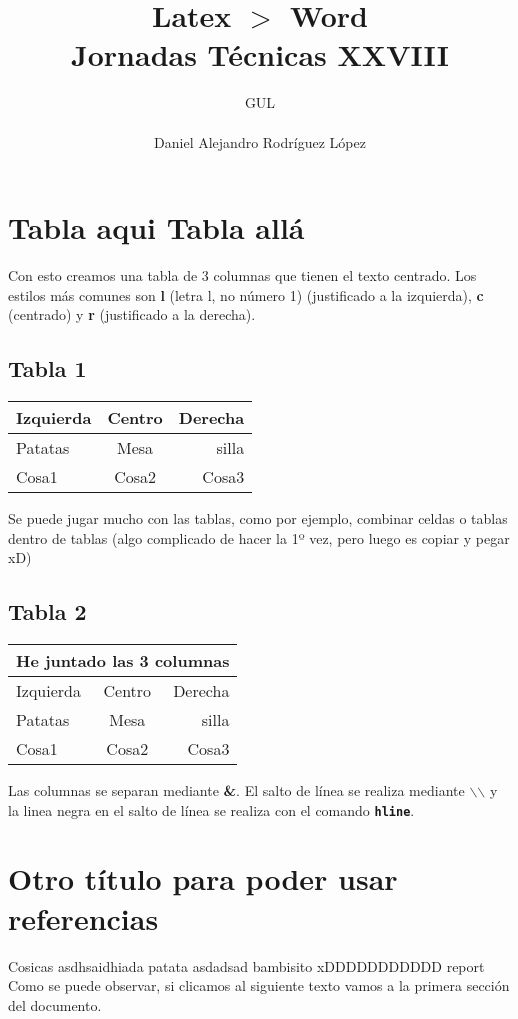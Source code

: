\documentclass[10pt,a4paper,titlepage]{article} %
\title{ \textbf{ \Huge{Latex $>$ Word}} \\ Jornadas Técnicas XXVIII}
\author{
		\begin{tabular}{l}
			\multicolumn{1}{l}{GUL} \\ \hline \\
			Daniel Alejandro Rodríguez López \\
		\end{tabular}
}
\begin{document}
\maketitle
\newpage

\tableofcontents
\newpage

	\section{Tabla aqui Tabla allá}
	\label{intro}
	Con esto creamos una tabla de 3 columnas que tienen el texto centrado. Los estilos más comunes son \textbf{l} (letra l, no número 1) (justificado a la izquierda), \textbf{c} (centrado) y \textbf{r} (justificado a la derecha). 

		\subsection{Tabla 1}
		\begin{center}
		\begin{tabular}{l c r}
		Izquierda & Centro & Derecha \\ \hline
		Patatas & Mesa & silla \\
		Cosa1 & Cosa2 & Cosa3 \\ \hline
		\end{tabular}
		\end{center}


		Se puede jugar mucho con las tablas, como por ejemplo, combinar celdas o tablas dentro de tablas (algo complicado de hacer la 1º vez, pero luego es copiar y pegar xD)

		\newpage
		\subsection{Tabla 2}
		\begin{center}
		\begin{tabular}{l c r}
		\multicolumn{3}{c}{He juntado las 3 columnas} \\ \hline
		Izquierda & Centro & Derecha \\ \hline
		Patatas & Mesa & silla \\
		Cosa1 & Cosa2 & Cosa3 \\ \hline
		\end{tabular}
		\end{center}

	Las columnas se separan mediante \textbf{\&}. El salto de línea se realiza mediante \textbf{$\backslash$$\backslash$} y la linea negra en el salto de línea se realiza con el comando \textbf{\texttt{hline}}.

	\newpage
	\section{Otro título para poder usar referencias}
	Cosicas asdhsaidhiada patata asdadsad bambisito xDDDDDDDDDDD report \\
	Como se puede observar, si clicamos al siguiente texto \textbf{} vamos a la primera sección del documento.
\end{document}

